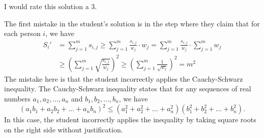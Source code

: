I would rate this solution a 3.

The first mistake in the student's solution is in the step where they claim that for each person $i$, we have
\begin{align*} S_i' &= \sum_{j=1}^{m} s_{i,j} \geq \sum_{j=1}^{m} \frac{s_{i,j}}{w_j} \cdot w_j = \sum_{j=1}^{m} \frac{s_{i,j}}{w_j} \cdot \sum_{j=1}^{m} w_j \\ &\geq \left(\sum_{j=1}^{m} \sqrt{\frac{s_{i,j}}{w_j}}\right)^2 \geq \left(\sum_{j=1}^{m} \frac{1}{\sqrt{w_j}}\right)^2 = m^2 \end{align*}
The mistake here is that the student incorrectly applies the Cauchy-Schwarz inequality. The Cauchy-Schwarz inequality states that for any sequences of real numbers $a_1, a_2, \ldots, a_n$ and $b_1, b_2, \ldots, b_n$, we have
\[(a_1b_1 + a_2b_2 + \ldots + a_nb_n)^2 \leq (a_1^2 + a_2^2 + \ldots + a_n^2)(b_1^2 + b_2^2 + \ldots + b_n^2).\]
In this case, the student incorrectly applies the inequality by taking square roots on the right side without justification.
